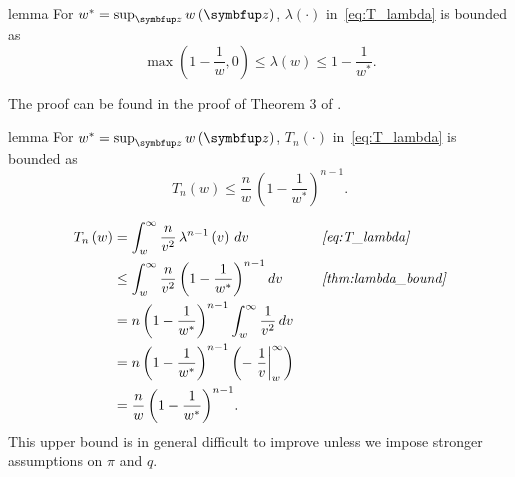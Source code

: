 
\begin{theoremEnd}{lemma}\label{thm:lambda_bound}
  For \(w^* = \sup_{\vz} w\left(\vz\right) \), \(\lambda\left(\cdot\right)\) in~\cref{eq:T_lambda} is bounded as
  \[
   \max\left(1 - \frac{1}{w}, 0\right) \leq \lambda\left(w\right) \leq 1 - \frac{1}{w^*}.
  \]
\end{theoremEnd}
\begin{proofEnd}
  The proof can be found in the proof of Theorem 3 of \citet{Smith96exacttransition}.
\end{proofEnd}

\begin{theoremEnd}{lemma}\label{thm:tn_bound}
  For \(w^* = \sup_{\vz} w\left(\vz\right) \), \(T_n\left(\cdot\right)\) in~\cref{eq:T_lambda} is bounded as
  \[
  T_n\left( w \right) \leq \frac{n}{w} \, {\left(1 - \frac{1}{w^*}\right)}^{n-1}.
  \]
\end{theoremEnd}
\begin{proofEnd}
  \begin{alignat*}{2}
    T_n\left(w\right) 
    &= \int_w^{\infty} \frac{n}{v^2} \, \lambda^{n-1}\left(v\right)\,dv
    &&\quad\text{\textit{\cref{eq:T_lambda}}}
    \\
    &\leq \int_w^{\infty} \frac{n}{v^2} \, {\left(1 - \frac{1}{w^*}\right)}^{n-1}\,dv
    &&\quad\text{\textit{\cref{thm:lambda_bound}}}
    \\
    &= n \, {\left(1 - \frac{1}{w^*}\right)}^{n-1}  \int_w^{\infty} \frac{1}{v^2} \,dv
    \\
    &= n \, {\left(1 - \frac{1}{w^*}\right)}^{n-1}  \left( {-\left.\frac{1}{v}\right\rvert^{\infty}_{w}} \right)
    \\
    &= \frac{n}{w} \, {\left(1 - \frac{1}{w^*}\right)}^{n-1}.
  \end{alignat*}
  This upper bound is in general difficult to improve unless we impose stronger assumptions on \(\pi\) and \(q\).
\end{proofEnd}

